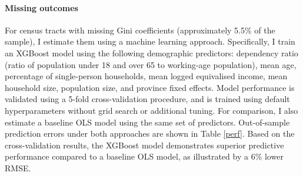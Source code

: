 \paragraph{Missing outcomes} For census tracts with missing Gini coefficients (approximately 5.5\% of the sample), I estimate them using a machine learning approach. Specifically, I train an XGBoost model using the following demographic predictors: dependency ratio (ratio of population under 18 and over 65 to working-age population), mean age, percentage of single-person households, mean logged equivalised income, mean household size, population size, and province fixed effects. Model performance is validated using a 5-fold cross-validation procedure, and is trained using default hyperparameters without grid search or additional tuning. For comparison, I also estimate a baseline OLS model using the same set of predictors. Out-of-sample prediction errors under both approaches are shown in Table \ref{perf}. Based on the cross-validation results, the XGBoost model demonstrates superior predictive performance compared to a baseline OLS model, as illustrated by a 6\% lower RMSE.

\begin{table}[H]
\centering
{}
\end{table}


